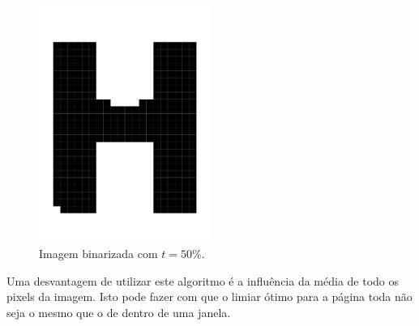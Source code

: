 \documentclass[a4paper,11pt]{article}
\begin{document}
    \begin{figure}[htb]
      \begin{center}
        \includegraphics[width=0.5\textwidth]{assets/binarization/bin_big.png}
        \end{center}
      \caption{Imagem binarizada com $t = 50\%.$}
      \label{fig:letrah_bin}
    \end{figure}

    Uma desvantagem de utilizar este algoritmo é a influência da média de todo os pixels da imagem. Isto pode fazer com que o limiar ótimo para a página toda não seja o mesmo que o de dentro de uma janela.




\end{document}
